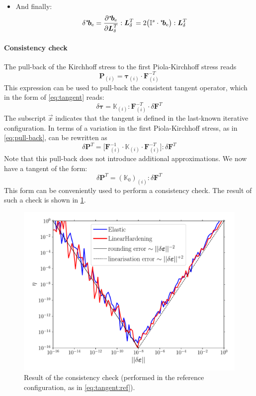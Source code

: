 \documentclass{goose-article}
\newcommand\ST[1]{\hspace*{-.3em}~^\star\!#1}
\newcommand\T[1]{\bm{{#1}}}
\newcommand\TT[1]{\mathbb{{#1}}}
\begin{document}
\begin{itemize}
    \item And finally:
    \begin{equation}
        \delta \ST{\T{b}}_\mathrm{e}
        = \frac{\partial \ST{\T{b}}_\mathrm{e}}{\partial \T{L}_\delta^T} : \T{L}_\delta^T
        = 2 \big( \TT{I}^s \cdot \ST{\T{b}}_\mathrm{e} \big) : \T{L}_\delta^T
    \end{equation}

\end{itemize}


\paragraph{Consistency check}

The pull-back of the Kirchhoff stress to the first Piola-Kirchhoff stress reads
\begin{equation}
    \T{P}_{(i)} = \bm{\tau}_{(i)} \cdot \T{F}^{-T}_{(i)}
\end{equation}
This expression can be used to pull-back the consistent tangent operator,
which in the form of \cref{eq:tangent} reads:
\begin{equation}
    \delta \bm{\tau}
    =
    \TT{K}_{(i)}
    : \T{F}_{(i)}^{-T} \cdot \delta \T{F}^T
    \label{eq:pull-back}
\end{equation}
The subscript $\vec{x}$ indicates that the tangent is defined
in the last-known iterative configuration.
In terms of a variation in the first Piola-Kirchhoff stress,
as in \cref{eq:pull-back}, can be rewritten as
\begin{equation}
    \delta \T{P}^T
    =
    \big[
    \T{F}_{(i)}^{-1} \cdot
    \TT{K}_{(i)}
    \cdot \T{F}_{(i)}^{-T}
    \big]
    : \delta \T{F}^T
\end{equation}
Note that this pull-back does not introduce additional approximations.
We now have a tangent of the form:
\begin{equation}
    \delta \T{P}^T = (\TT{K}_0)_{(i)} : \delta \T{F}^T
    \label{eq:tangent:ref}
\end{equation}
This form can be conveniently used to perform a consistency check.
The result of such a check is shown in \cref{fig:consistency}.

\begin{figure}[htp]
    \centering
    \includegraphics[width=.5\textwidth]{examples/consistency}
    \caption{
        Result of the consistency check
        (performed in the reference configuration, as in \cref{eq:tangent:ref}).}
    \label{fig:consistency}
\end{figure}


\end{document}
